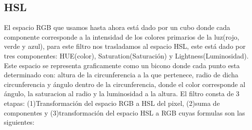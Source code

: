 \documentclass[a4paper]{article}
\begin{document}
\subsection{HSL}
El espacio RGB que usamos hasta ahora está dado por un cubo donde cada componente corresponde a la intensidad de los colores primarios de la luz(rojo, verde y azul), para este filtro nos trasladamos al espacio HSL, este está dado por tres componentes: HUE(color), Saturation(Saturación) y Lightness(Luminosidad). Este espacio se representa graficamente como un bicono donde cada punto esta determinado con: altura de la circunferencia a la que pertenece, radio de dicha circunferencia y ángulo dentro de la circunferencia, donde el color corresponde al ángulo, la saturacion al radio y la luminosidad a la altura.
El filtro consta de 3 etapas: (1)Transformación del espacio RGB a HSL del pixel, (2)suma de componentes y (3)transformación del espacio HSL a RGB cuyas formulas son las siguientes:
\newline
\end{document}
